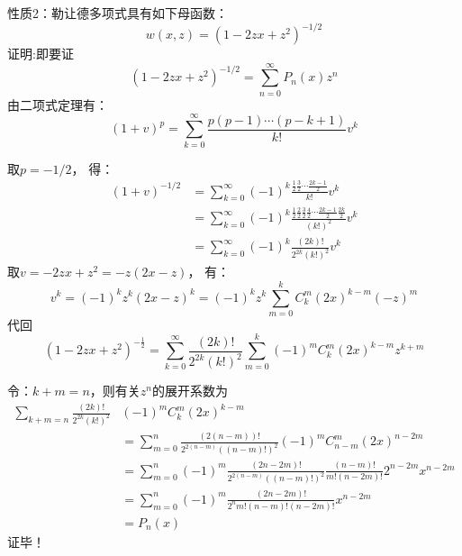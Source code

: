 	{\alert{性质2：}}勒让德多项式具有如下母函数：
	\begin{equation*}
		w(x, z)=\left(1-2 z x+z^{2}\right)^{-1 / 2}
	\end{equation*}	
	{\alert{证明:}}即要证
	\begin{equation*}
		\left(1-2 z x+z^{2}\right)^{-1 / 2}=\sum_{n=0}^{\infty} P_n(x) z^n
	\end{equation*}	
	由二项式定理有：
	\begin{equation*}
		(1+v)^{p}=\sum_{k=0}^{\infty} \frac{p(p-1) \cdots(p-k+1)}{k !} v^{k}
	\end{equation*}	
	


	取$p=-1/2$， 得：
	\begin{align*}
		(1+v)^{-1/2}&=\sum_{k=0}^{\infty} (-1)^{k}\frac{\frac{1}{2}\frac{3}{2}  \cdots \frac{2k-1}{2}}{k !} v^{k}\\
		&=\sum_{k=0}^{\infty} (-1)^{k}\frac{\frac{1}{2}\frac{2}{2}\frac{3}{2} \frac{4}{2}  \cdots \frac{2k-1}{2}\frac{2k}{2}} {(k !)^2} v^{k}\\
		&=\sum_{k=0}^{\infty}(-1)^{k} \frac{(2 k) !}{2^{2 k}(k !)^{2}} v^{k}
	\end{align*}	
	取$v=-2zx+z^2=-z(2x-z)$， 有：
	\begin{equation*}
		v^{k}=(-1)^{k} z^{k}(2 x-z)^{k}=(-1)^{k} z^{k} \sum_{m=0}^{k} C_{k}^{m}(2 x)^{k-m}(-z)^{m}
	\end{equation*}	
	代回
	\begin{equation*}
		\left(1-2 z x+z^{2}\right)^{-\frac{1}{2}}=\sum_{k=0}^{\infty} \frac{(2 k) !}{2^{2 k}(k !)^{2}} \sum_{m=0}^{k}(-1)^{m} C_{k}^{m}(2 x)^{k-m} z^{k+m}
	\end{equation*}	
	


	令：$k+m=n$，则有关$z^{n}$的展开系数为
	\begin{equation*}
	\begin{split}
		\sum_{k+m=n}\frac{(2 k) !}{2^{2 k}(k !)^{2}} & (-1)^{m} C_{k}^{m}(2 x)^{k-m}\\
		&=\sum_{m=0}^{n} \frac{(2 (n-m)) !}{2^{2 (n-m)}((n-m) !)^{2}}(-1)^{m} C_{n-m}^{m}(2 x)^{n-2m}\\
		&=\sum_{m=0}^{n}(-1)^{m} \frac{(2 n-2m) !}{2^{2 (n-m)}((n-m) !)^{2}} \frac{(n-m) !}{m!(n-2 m) !}2^{n-2 m}x^{n-2 m}\\
		&=\sum_{m=0}^{n}(-1)^{m} \frac{(2 n-2 m) !}{2^{n} m !(n-m) !(n-2 m) !} x^{n-2 m} \\
		&=P_{n}(x)
	\end{split}
	\end{equation*}	
	{\alert{证毕！}}
	


